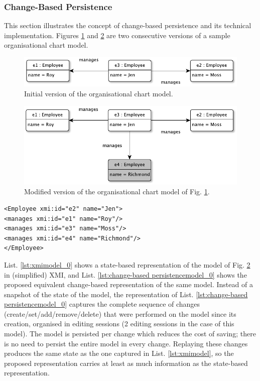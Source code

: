 \documentclass[12pt, a4paper]{report} \usepackage[titletoc]{appendix}
\begin{document}
\subsubsection{Change-Based Persistence}
\label{change-based_persistence}
This section illustrates the concept of change-based persistence and its technical implementation. Figures \ref{fig:initial_chart_0} and \ref{fig:modified_chart} are two consecutive versions of a sample organisational chart model. 

\begin{figure}[ht]
	\centering
	\includegraphics[width=\linewidth]{initial_chart_0}
	\caption{Initial version of the organisational chart model.}
	\label{fig:initial_chart_0}
\end{figure}

\begin{figure}[ht]
	\centering
	\includegraphics[width=\linewidth]{modified_chart}
	\caption{Modified version of the organisational chart model of Fig. \ref{fig:initial_chart_0}.}
	\label{fig:modified_chart}
\end{figure}

\begin{lstlisting}[style=xmi,caption={State-based representation of the model of Figure \ref{fig:modified_chart} in (simplified) XMI.},label=lst:xmimodel_0]
<Employee xmi:id="e2" name="Jen">
<manages xmi:id="e1" name="Roy"/>
<manages xmi:id="e3" name="Moss"/>
<manages xmi:id="e4" name="Richmond"/>
</Employee>
\end{lstlisting}

List. \ref{lst:xmimodel_0} shows a state-based representation of the model of Fig. \ref{fig:modified_chart} in (simplified) XMI, and List. \ref{lst:change-based persistencemodel_0} shows the proposed equivalent change-based representation of the same model. Instead of a snapshot of the state of the model, the representation of List. \ref{lst:change-based persistencemodel_0} captures the complete sequence of changes (create/set/add/remove/delete) that were performed on the model since its creation, organised in editing sessions (2 editing sessions in the case of this model). The model is persisted per change which reduces the cost of saving; there is no need to persist the entire model in every change.  Replaying these changes produces the same state as the one captured in List. \ref{lst:xmimodel}, so the proposed representation carries at least as much information as the state-based representation.
\end{document}
